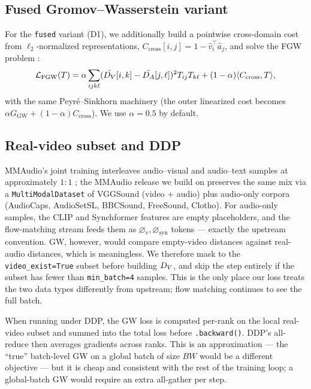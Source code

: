 \subsection{Fused Gromov--Wasserstein variant}
\label{sec:method:fgw}
For the \texttt{fused} variant (D1), we additionally build a
pointwise cross-domain cost from $\ell_2$-normalized
representations,
$C_{\text{cross}}[i,j] = 1 - \hat v_i^{\top} \hat a_j$, and solve
the FGW problem \citep{vayer2020fused}:
\begin{equation}
  \mathcal{L}_{\mathrm{FGW}}(T) =
    \alpha \sum_{ijk\ell}
    (\tilde {D_{V}}[i,k] - \tilde {D_{A}}[j,\ell])^2 T_{ij} T_{k\ell}
    + (1-\alpha) \langle C_{\text{cross}}, T \rangle,
\end{equation}
with the same Peyr\'e--Sinkhorn machinery (the outer linearized
cost becomes $\alpha G_{\mathrm{GW}} + (1-\alpha) C_{\text{cross}}$).
We use $\alpha = 0.5$ by default.

\subsection{Real-video subset and DDP}
\label{sec:method:subset}
MMAudio's joint training interleaves audio--visual and
audio--text samples at approximately $1{:}1$
\citep{cheng2024mmaudio}; the MMAudio release we build on
preserves the same mix via a \texttt{MultiModalDataset} of
VGGSound (video + audio) plus audio-only corpora (AudioCaps,
AudioSetSL, BBCSound, FreeSound, Clotho). For audio-only
samples, the CLIP and Synchformer features are empty
placeholders, and the flow-matching stream feeds them as
$\varnothing_v, \varnothing_{\mathrm{syn}}$ tokens --- exactly
the upstream convention. GW, however, would compare empty-video
distances against real-audio distances, which is meaningless.
We therefore mask to the \texttt{video\_exist=True} subset
before building $D_{V}$, and skip the step entirely if the subset
has fewer than \texttt{min\_batch=4} samples. This is the only
place our loss treats the two data types differently from
upstream; flow matching continues to see the full batch.

When running under DDP, the GW loss is computed per-rank on the
local real-video subset and summed into the total loss before
\texttt{.backward()}. DDP's all-reduce then averages gradients
across ranks. This is an approximation --- the ``true''
batch-level GW on a global batch of size $B W$ would be a
different objective --- but it is cheap and consistent with the
rest of the training loop; a global-batch GW would require an
extra all-gather per step.

